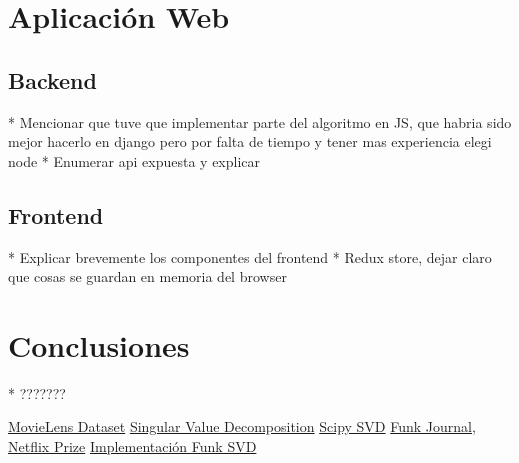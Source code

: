 \documentclass[a4paper, 11pt]{article}
\begin{document}
    \section{Aplicación Web}
    	\subsection{Backend}
    	 * Mencionar que tuve que implementar parte del algoritmo en JS, que habria sido mejor hacerlo en django pero por falta de tiempo y tener mas experiencia elegi node
    	 * Enumerar api expuesta y explicar
     	\subsection{Frontend}
     	 * Explicar brevemente los componentes del frontend
     	 * Redux store, dejar claro que cosas se guardan en memoria del browser
	\section{Conclusiones}
  	 * ???????
 	
\begin{thebibliography}{50}
	
	\href{https://grouplens.org/datasets/movielens/ }{MovieLens Dataset}
	\href{https://en.wikipedia.org/wiki/Singular-value_decomposition}{Singular Value Decomposition}
	\href{https://docs.scipy.org/doc/scipy/reference/generated/scipy.linalg.svd.html}{Scipy SVD}
	\href{http://sifter.org/simon/journal/20061211.html}{Funk Journal, Netflix Prize}
	\href{TODO!~~!!!!!!!}{Implementación Funk SVD}
\end{thebibliography}
\end{document}
